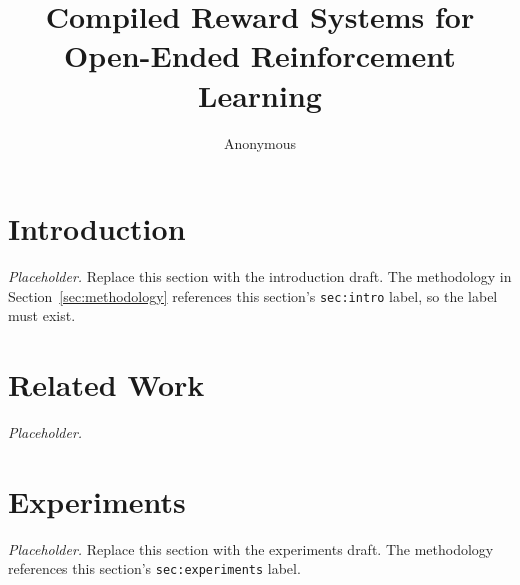 \documentclass[11pt]{article}
\begin{document}

\title{Compiled Reward Systems for Open-Ended Reinforcement Learning}
\author{Anonymous}
\date{}
\maketitle

\section{Introduction}
\label{sec:intro}

\textit{Placeholder.}  Replace this section with the introduction draft.
The methodology in Section~\ref{sec:methodology} references this
section's \texttt{sec:intro} label, so the label must exist.

\section{Related Work}
\label{sec:related}

\textit{Placeholder.}



\section{Experiments}
\label{sec:experiments}

\textit{Placeholder.}  Replace this section with the experiments draft.
The methodology references this section's \texttt{sec:experiments} label.




\end{document}
